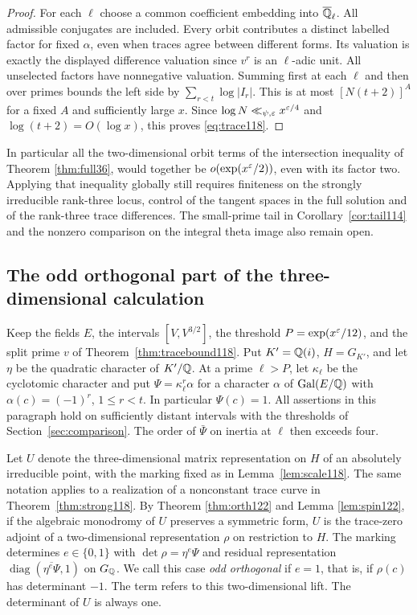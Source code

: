 \documentclass[a4paper,11pt]{article}
\theoremstyle{definition}
\theoremstyle{remark}
\numberwithin{equation}{section}
\begin{document}
\begin{proof}
For each \(\ell\) choose a common coefficient embedding into
\(\overline{\mathbb Q}_\ell\). All admissible conjugates are included.
Every orbit contributes a distinct labelled factor for fixed
\(\alpha\), even when traces agree between different forms.
Its valuation is exactly the displayed difference valuation
since \(v^r\) is an \(\ell\)-adic unit. All unselected factors
have nonnegative valuation. Summing first at each \(\ell\) and
then over primes bounds the left side by \(\sum_{r<t}\log|I_r|\).
This is at most \([N(t+2)]^A\) for a fixed \(A\) and sufficiently
large \(x\). Since \(\log N\ll_{\psi,\varepsilon}x^{\varepsilon/4}\) and
\(\log(t+2)=O(\log x)\), this proves \eqref{eq:trace118}.
\end{proof}

In particular all the two-dimensional orbit terms of the
intersection inequality of Theorem \ref{thm:full36}, would
together be \(o(\exp(x^\varepsilon/2))\), even with its factor two.
Applying that inequality globally still requires finiteness on
the strongly irreducible rank-three locus, control of the
tangent spaces in the full solution and of the rank-three
trace differences. The small-prime tail in
Corollary~\ref{cor:tail114} and the nonzero comparison on
the integral theta image also remain open.

\subsection{The odd orthogonal part of the three-dimensional calculation}\label{nav:IV-27}
Keep the fields \(E\), the intervals \([V,V^{3/2}]\), the
threshold \(P=\exp(x^\varepsilon/12)\), and the split prime \(v\) of
Theorem~\ref{thm:tracebound118}. Put \(K'=\mathbb Q(i)\),
\(H=G_{K'}\), and let \(\eta\) be the quadratic character of
\(K'/\mathbb Q\). At a prime \(\ell>P\), let \(\kappa_\ell\) be
the cyclotomic character and put \(\Psi=\kappa_\ell^r\alpha\)
for a character \(\alpha\) of \(\operatorname{Gal}(E/\mathbb Q)\) with
\(\alpha(c)=(-1)^r\), \(1\le r<t\). In particular \(\Psi(c)=1\).
All assertions in this paragraph hold on sufficiently distant
intervals with the thresholds of Section~\ref{sec:comparison}.
The order of \(\bar\Psi\) on inertia at \(\ell\) then exceeds four.

Let \(U\) denote the three-dimensional matrix representation on
\(H\) of an absolutely irreducible point, with the marking fixed
as in Lemma~\ref{lem:scale118}. The same notation applies to a
realization of a nonconstant trace curve in
Theorem~\ref{thm:strong118}. By
Theorem \ref{thm:orth122} and Lemma \ref{lem:spin122}, if the algebraic monodromy of \(U\) preserves
a symmetric form, \(U\) is the trace-zero adjoint of a
two-dimensional representation \(\rho\) on restriction to \(H\).
The marking determines \(e\in\{0,1\}\) with
\(\det\rho=\eta^e\Psi\) and residual representation
\(\operatorname{diag}(\overline{\eta^e\Psi},1)\) on \(G_\mathbb Q\).
We call this case \emph{odd orthogonal} if \(e=1\), that is,
if \(\rho(c)\) has determinant \(-1\). The term refers to this
two-dimensional lift. The determinant of \(U\) is always one.
\end{document}
